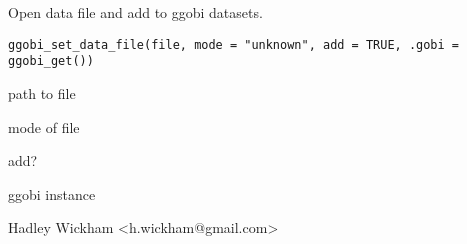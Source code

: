 \documentclass{article}
\begin{document}
\begin{Description}\relax
Open data file and add to ggobi datasets.
\end{Description}
\begin{Usage}
\begin{verbatim}ggobi_set_data_file(file, mode = "unknown", add = TRUE, .gobi = ggobi_get())\end{verbatim}
\end{Usage}
\begin{Arguments}
\begin{ldescription}
\item[\code{file}] path to file
\item[\code{mode}] mode of file
\item[\code{add}] add?
\item[\code{.gobi}] ggobi instance
\end{ldescription}
\end{Arguments}
\begin{Details}\relax
\end{Details}
\begin{Author}\relax
Hadley Wickham <h.wickham@gmail.com>
\end{Author}
\begin{Examples}
\begin{ExampleCode}\end{ExampleCode}
\end{Examples}
\end{document}
